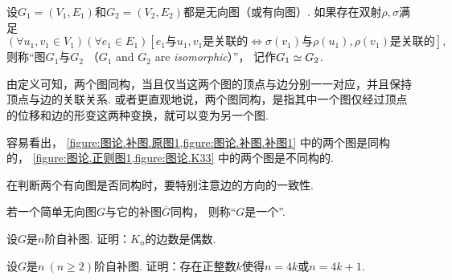 \begin{definition}
设\(G_1 = (V_1,E_1)\)和\(G_2 = (V_2,E_2)\)都是无向图（或有向图）.
如果存在双射\(\rho,\sigma\)满足\begin{equation*}
	(\forall u_1,v_1 \in V_1)
	(\forall e_1 \in E_1)
	\left[
		\text{$e_1$与$u_1,v_1$是关联的}
		\iff
		\text{$\sigma(v_1)$与$\rho(u_1),\rho(v_1)$是关联的}
	\right],
\end{equation*}
则称“图\(G_1\)与\(G_2\) %
（\(G_1\) and \(G_2\) are \emph{isomorphic}）”，
记作\(G_1 \simeq G_2\).
\end{definition}

由定义可知，两个图同构，当且仅当这两个图的顶点与边分别一一对应，并且保持顶点与边的关联关系.
或者更直观地说，两个图同构，是指其中一个图仅经过顶点的位移和边的形变这两种变换，就可以变为另一个图.

容易看出，
\cref{figure:图论.补图.原图1,figure:图论.补图.补图1} 中的两个图是同构的，
\cref{figure:图论.正则图1,figure:图论.K33} 中的两个图是不同构的.

\begin{figure}[hbt]
	\centering
	\caption{}
	\label{figure:图论.K33}
\end{figure}

在判断两个有向图是否同构时，要特别注意边的方向的一致性.

\begin{definition}
若一个简单无向图\(G\)与它的补图\(\overline{G}\)同构，
则称“\(G\)是一个”.
\end{definition}

\begin{example}
设\(G\)是\(n\)阶自补图.
证明：\(K_n\)的边数是偶数.
\end{example}

\begin{example}
设\(G\)是\(n\ (n\geq2)\)阶自补图.
证明：存在正整数\(k\)使得\(n=4k\)或\(n=4k+1\).
\end{example}

